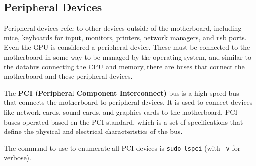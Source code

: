 \documentclass{article}
\begin{document}
    \subsection{Peripheral Devices} 
      
      Peripheral devices refer to other devices outside of the motherboard, including mice, keyboards for input, monitors, printers, network managers, and usb ports. Even the GPU is considered a peripheral device. These must be connected to the motherboard in some way to be managed by the operating system, and similar to the databus connecting the CPU and memory, there are buses that connect the motherboard and these peripheral devices. 

      \begin{definition}
        The \textbf{PCI (Peripheral Component Interconnect)} bus is a high-speed bus that connects the motherboard to peripheral devices. It is used to connect devices like network cards, sound cards, and graphics cards to the motherboard. PCI buses operated based on the PCI standard, which is a set of specifications that define the physical and electrical characteristics of the bus. 
      \end{definition}

      The command to use to enumerate all PCI devices is \texttt{sudo lspci} (with \texttt{-v} for verbose). 
      
\end{document}
